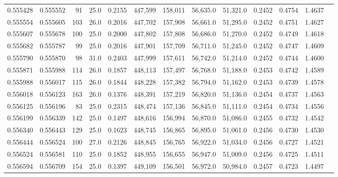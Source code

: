 \begin{tabular}{rrrrrrrrrrrrr}
0.555428 & 0.555552 &    91 & 25.0 &                                     0.2155 & 447,599 & 158,011 &  56,635.0 &  51,321.0 & 0.2452 & 0.4754 & 1.4637 \\
0.555554 & 0.555605 &   103 & 26.0 &                                     0.2016 & 447,702 & 157,908 &  56,661.0 &  51,295.0 & 0.2452 & 0.4751 & 1.4627 \\
0.555607 & 0.555678 &   100 & 25.0 &                                     0.2000 & 447,802 & 157,808 &  56,686.0 &  51,270.0 & 0.2452 & 0.4749 & 1.4618 \\
0.555682 & 0.555787 &    99 & 25.0 &                                     0.2016 & 447,901 & 157,709 &  56,711.0 &  51,245.0 & 0.2452 & 0.4747 & 1.4609 \\
0.555790 & 0.555870 &    98 & 31.0 &                                     0.2403 & 447,999 & 157,611 &  56,742.0 &  51,214.0 & 0.2452 & 0.4744 & 1.4600 \\
0.555871 & 0.555988 &   114 & 26.0 &                                     0.1857 & 448,113 & 157,497 &  56,768.0 &  51,188.0 & 0.2453 & 0.4742 & 1.4589 \\
0.555988 & 0.556017 &   115 & 26.0 &                                     0.1844 & 448,228 & 157,382 &  56,794.0 &  51,162.0 & 0.2453 & 0.4739 & 1.4578 \\
0.556018 & 0.556123 &   163 & 26.0 &                                     0.1376 & 448,391 & 157,219 &  56,820.0 &  51,136.0 & 0.2454 & 0.4737 & 1.4563 \\
0.556125 & 0.556196 &    83 & 25.0 &                                     0.2315 & 448,474 & 157,136 &  56,845.0 &  51,111.0 & 0.2454 & 0.4734 & 1.4556 \\
0.556199 & 0.556339 &   142 & 25.0 &                                     0.1497 & 448,616 & 156,994 &  56,870.0 &  51,086.0 & 0.2455 & 0.4732 & 1.4542 \\
0.556340 & 0.556443 &   129 & 25.0 &                                     0.1623 & 448,745 & 156,865 &  56,895.0 &  51,061.0 & 0.2456 & 0.4730 & 1.4530 \\
0.556444 & 0.556524 &   100 & 27.0 &                                     0.2126 & 448,845 & 156,765 &  56,922.0 &  51,034.0 & 0.2456 & 0.4727 & 1.4521 \\
0.556524 & 0.556581 &   110 & 25.0 &                                     0.1852 & 448,955 & 156,655 &  56,947.0 &  51,009.0 & 0.2456 & 0.4725 & 1.4511 \\
0.556594 & 0.556709 &   154 & 25.0 &                                     0.1397 & 449,109 & 156,501 &  56,972.0 &  50,984.0 & 0.2457 & 0.4723 & 1.4497 \\

\end{tabular}
